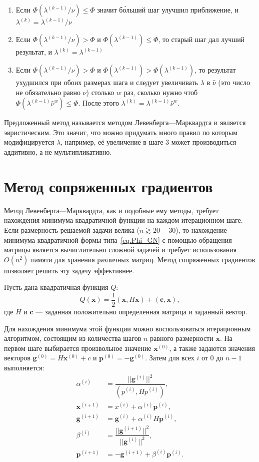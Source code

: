 \documentclass[fontsize=12pt, paper=a4]{article}
\renewcommand{\vec}[1]{\mathbf{#1}}
\def\x{\vec{x}}
\def\c{\vec{c}}
\begin{document}
\begin{enumerate}
 \item Если $\Phi(\lambda^{(k-1)} / \nu) \leq \Phi$ значит б\'{о}льший шаг улучшил приближение, и $\lambda^{(k)} = \lambda^{(k-1)} / \nu$
 \item Если $\Phi(\lambda^{(k-1)} / \nu) > \Phi$ и $\Phi(\lambda^{(k-1)}) \leq \Phi$, то старый шаг дал лучший результат, и $\lambda^{(k)} = \lambda^{(k-1)}$
 \item Если $\Phi(\lambda^{(k-1)} / \nu) > \Phi$ и $\Phi(\lambda^{(k-1)}) > \Phi(\lambda^{(k-1)})$, то результат ухудшился при обоих размерах шага и следует увеличивать $\lambda$ в $\hat\nu$ (это число не обязательно равно $\nu$) столько $w$ раз, сколько нужно чтоб $\Phi(\lambda^{(k-1)} \hat\nu^w) \leq \Phi$.
  После этого $\lambda^{(k)} = \lambda^{(k-1)} \hat\nu^w$.
\end{enumerate}

Предложенный метод называется методом Левенберга---Марквардта и является эвристическим.
Это значит, что можно придумать много правил по которым модифицируется $\lambda$, например, её увеличение в шаге 3 может производиться аддитивно, а не мультипликативно.

\section{Метод сопряженных градиентов}
Метод Левенберга---Марквардта, как и подобные ему методы, требует нахождения минимума квадратичной функции на каждом итерационном шаге.
Если размерность решаемой задачи велика ($n \gtrsim 20-30$), то нахождение минимума квадратичной формы типа~\eqref{eq.Phi_GN} с помощью обращения матрицы является вычислительно сложной задачей и требует использования $O(n^2)$ памяти для хранения различных матриц.
Метод сопряженных градиентов позволяет решить эту задачу эффективнее.

Пусть дана квадратичная функция $Q$:
\begin{equation}
Q(\x) = \dfrac12 (\x, H \x) + (\c, \x),
\end{equation}
где $H$ и $\c$ --- заданная положительно определенная матрица и заданный вектор.

Для нахождения минимума этой функции можно воспользоваться итерационным алгоритмом, состоящим из количества шагов $n$ равного размерности $\x$.
На первом шаге выбирается произвольное значение $\x^{(0)}$, а также задаются значения векторов $\vec{g}^{(0)} = H\x^{(0)} + c$ и $\vec{p}^{(0)} = - \vec{g}^{(0)}$.
Затем для всех $i$ от 0 до $n-1$ выполняется:
\begin{equation}
\begin{split}
 \alpha^{(i)} &= \dfrac{||\vec{g}^{(i)}||^2}{(p^{(i)}, H p^{(i)})},\\
 \x^{(i+1)} &= x^{(i)} + \alpha^{(i)} \vec{p}^{(i)},\\
 \vec{g}^{(i+1)} &= \vec{g}^{(i)} + \alpha^{(i)} H \vec{p}^{(i)},\\
 \beta^{(i)} &= \dfrac{||\vec{g}^{(i+1)}||^2}{||\vec{g}^{(i)}||^2},\\
 \vec{p}^{(i+1)} &= -\vec{g}^{(i+1)} + \beta^{(i)} \vec{p}^{(i)}.
\end{split}
\end{equation}
\end{document}
